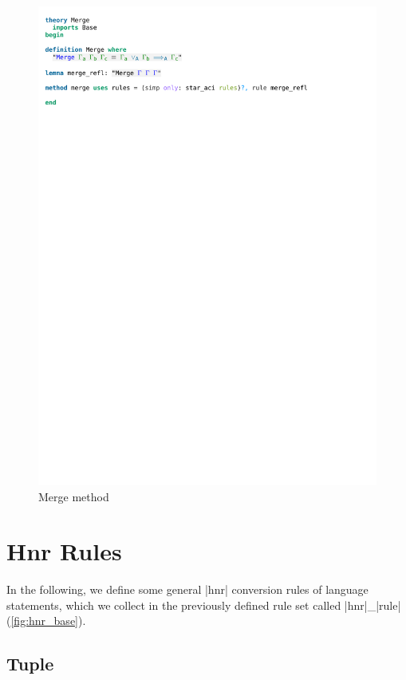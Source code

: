 \begin{figure}[htpb]
    \includegraphics[trim={0 24,4cm 0 3,9cm}, clip, width=1.00\textwidth]{figures/Theory_Merge.pdf}
    \caption[Merge method]{Merge method}
    \label{fig:merge_method}
\end{figure}

\section{Hnr Rules}\label{section:hnr_rules}

In the following, we define some general |hnr| conversion rules of language statements, which we collect in the previously defined rule set called |hnr|\_|rule| (\autoref{fig:hnr_base}).

\subsection{Tuple}


